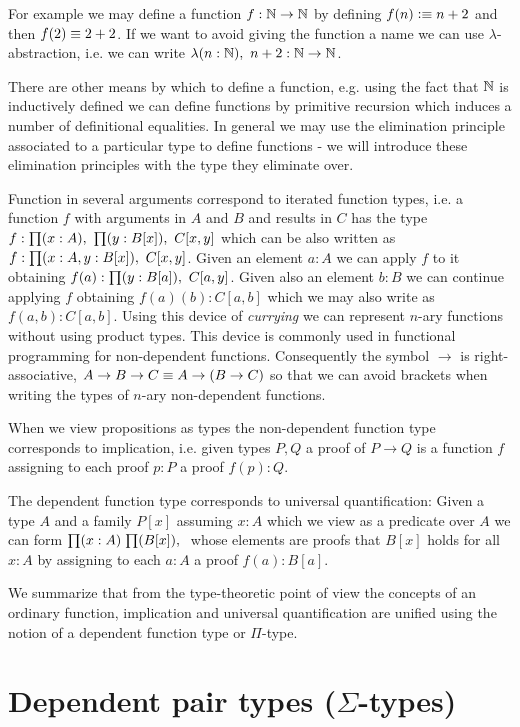 {For example we may define a function $f : \mathbb{N} \to \mathbb{N}$ by defining $f(n)
\vcentcolon\equiv n+2$ and then $f(2) \equiv 2+2$. If we want to avoid giving the function a name we can use
$\lambda$-abstraction, i.e. we can write $\lam{n:\Nat}n+2 : \Nat
\to \Nat$. 

There are other means by which to define a function,
e.g. using the fact that $\mathbb{N}$ is inductively defined we can define
functions by primitive recursion which induces a number of
definitional equalities. In general we may use the
elimination principle associated to a particular type to define
functions - we will introduce these elimination principles with the
type they eliminate over.

Function in several arguments correspond to iterated function types,
i.e. a function $f$ with arguments in $A$ and $B$ and results in $C$ has
the type $f : \prd{x:A}\prd{y : B[x]}C[x,y]$ which can be also
written as $f : \prd{x:A,y:B[x]}C[x,y]$. Given an element $a:A$ we can apply
$f$ to it obtaining $f(a) : \prd{y:B[a]}C[a,y]$. Given also an element $b:B$ we
can continue applying $f$ obtaining $f(a)(b) : C[a,b]$ which we may also
write as $f(a,b):C[a,b]$. Using this device of \emph{currying} we can
represent $n$-ary functions without using product types. 
This device is commonly used in functional programming for
non-dependent functions. Consequently the symbol $\to$ is
right-associative,  $A \to B \to C \equiv A \to (B \to C)$ so that we can avoid
brackets when writing the types of $n$-ary non-dependent functions.

When we view propositions as types the non-dependent function type
corresponds to implication, i.e. given types $P,Q$ a proof of $P \to
Q$ is a function $f$ assigning to each proof $p:P$ a proof $f(p) : Q$.

The dependent function type corresponds to universal
quantification: Given a type $A$ and a family $P[x]$ assuming $x:A$
which we view as a predicate over $A$ we can form $\prd{x:A}{B[x]}$
whose elements are proofs that $B[x]$ holds for all $x:A$ by assigning
to each $a:A$ a proof $f(a) : B[a]$.

We summarize that from the type-theoretic point of view the concepts
of an ordinary function, implication and universal quantification are
unified using the notion of a dependent function type or $\Pi$-type.

\section{Dependent pair types (\texorpdfstring{$\Sigma$}{Σ}-types)}
\label{sec:sigma-types}

}
